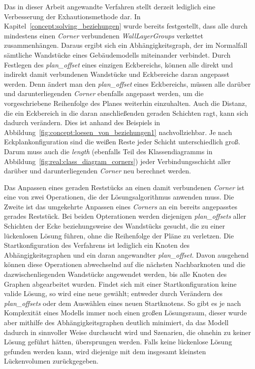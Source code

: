 Das in dieser Arbeit angewandte Verfahren stellt derzeit lediglich eine Verbesserung der Exhautionsmethode dar.
In Kapitel~\ref{concept:solving_beziehungen} wurde bereits festgestellt, dass alle durch mindestens einen \textit{Corner} verbundenen \textit{WallLayerGroups} verkettet zusammenhängen.
Daraus ergibt sich ein Abhängigkeitsgraph, der im Normalfall sämtliche Wandstücke eines Gebäudemodells miteinander verbindet.
Durch Festlegen des \textit{plan\_offset} eines einzigen Eckbereichs, können alle direkt und indirekt damit verbundenen Wandstücke und Eckbereiche daran angepasst werden.
Denn ändert man den \textit{plan\_offset} eines Eckbereichs, müssen alle darüber und darunterliegenden \textit{Corner} ebenfalls angepasst werden, um die vorgeschriebene Reihenfolge des Planes weiterhin einzuhalten.
Auch die Distanz, die ein Eckbereich in die daran anschließenden geraden Schichten ragt, kann sich dadurch verändern.
Dies ist anhand des Beispiels in Abbildung~\ref{fig:concept:loesen_von_beziehungen1} nachvollziehbar.
Je nach Eckplankonfiguration sind die weißen Reste jeder Schicht unterschiedlich groß.
Darum muss auch die \textit{length} (ebenfalls Teil des Klassendiagramms in Abbildung~\ref{fig:real:class_diagram_corners}) jeder Verbindungsschicht aller darüber und darunterliegenden \textit{Corner} neu berechnet werden.

Das Anpassen eines geraden Reststücks an einen damit verbundenen \textit{Corner} ist eine von zwei Operationen, die der Lösungsalgorithmus anwenden muss.
Die Zweite ist das umgekehrte Anpassen eines \textit{Corners} an ein bereits angepasstes gerades Reststück.
Bei beiden Opterationen werden diejenigen \textit{plan\_offsets} aller Schichten der Ecke beziehungsweise des Wandstücks gesucht, die zu einer lückenlosen Lösung führen, ohne die Reihenfolge der Pläne zu verletzen.
Die Startkonfiguration des Verfahrens ist lediglich ein Knoten des Abhängigkeitsgraphen und ein daran angewandter \textit{plan\_offset}.
Davon ausgehend können diese Operationen abwechselnd auf die nächsten Nachbarknoten und die dazwischenliegenden Wandstücke angewendet werden, bis alle Knoten des Graphen abgearbeitet wurden.
Findet sich mit einer Startkonfiguration keine valide Lösung, so wird eine neue gewählt; entweder durch Verändern des \textit{plan\_offsets} oder dem Auswählen eines neuen Startknotens.
So gibt es je nach Komplexität eines Modells immer noch einen großen Lösungsraum, dieser wurde aber mithilfe des Abhängigkeitsgraphen deutlich minimiert, da das Modell dadurch in sinnvoller Weise durchsucht wird und Szenarien, die ohnehin zu keiner Lösung geführt hätten, übersprungen werden.
Falls keine lückenlose Lösung gefunden werden kann, wird diejenige mit dem insgesamt kleinsten Lückenvolumen zurückgegeben.

